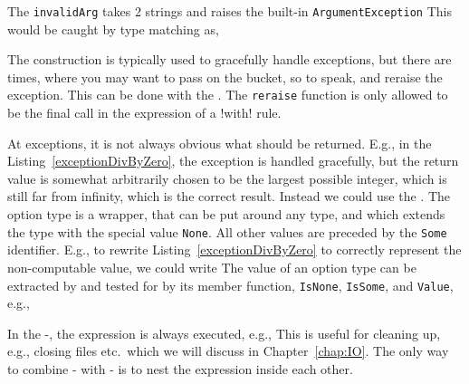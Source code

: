The \lstinline!invalidArg! takes 2 strings and raises the built-in \lstinline!ArgumentException!
%
%
This would be caught by type matching as,
%
%

The  construction is typically used to gracefully handle exceptions, but there are times, where you may want to pass on the bucket, so to speak, and reraise the exception. This can be done with the .
%
%
The \lstinline!reraise! function is only allowed to be the final call in the expression of a \keyword!with! rule.

At exceptions, it is not always obvious what should be returned. E.g., in the Listing~\ref{exceptionDivByZero}, the exception is handled gracefully, but the return value is somewhat arbitrarily chosen to be the largest possible integer, which is still far from infinity, which is the correct result. Instead we could use the . The option type is a wrapper, that can be put around any type, and which extends the type with the special value \lstinline!None!. All other values are preceded by the \lstinline!Some! identifier. E.g., to rewrite Listing~\ref{exceptionDivByZero} to correctly represent the non-computable value, we could write
%
%
The value of an option type can be extracted by and tested for by its member function, \lstinline!IsNone!, \lstinline!IsSome!, and \lstinline!Value!, e.g.,
%
%

In the -, the  expression is always executed, e.g.,
%
%
This is useful for cleaning up, e.g., closing files etc.\ which we will discuss in Chapter~\ref{chap:IO}. The only way to combine - with - is to nest the expression inside each other.

\begin{comment}
\begin{itemize}
\item exn type Spec-4.0 Chapter 18.1
\item Spec-4.0 Section 18.2.8
\end{itemize}
\end{comment}



